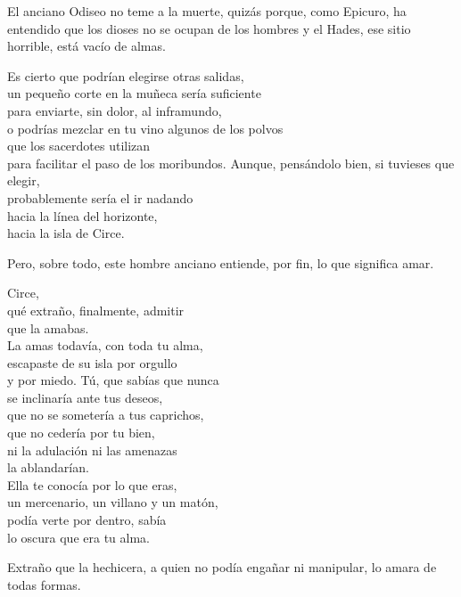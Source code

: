 El anciano Odiseo no teme a la muerte, quizás porque, como Epicuro, ha entendido que los dioses no se ocupan de los hombres y el Hades, ese sitio horrible, está vacío de almas.

\begin{versopropio}
Es cierto que podrían elegirse otras salidas,\\
un pequeño corte en la muñeca sería suficiente\\
para enviarte, sin dolor, al inframundo,\\
o podrías mezclar en tu vino algunos de los polvos\\
que los sacerdotes utilizan\\
para facilitar el paso de los moribundos.
\stanzabreak
Aunque, pensándolo bien, si tuvieses que elegir,\\
probablemente sería el ir nadando\\
hacia la línea del horizonte,\\
hacia la isla de Circe.
\end{versopropio}

Pero, sobre todo, este hombre anciano entiende, por fin, lo que significa amar.

\begin{versopropio}
Circe,\\
qué extraño, finalmente, admitir\\
que la amabas.\\
La amas todavía, con toda tu alma,\\
escapaste de su isla por orgullo\\
y por miedo.
\stanzabreak
Tú, que sabías que nunca\\
se inclinaría ante tus deseos,\\
que no se sometería a tus caprichos,\\
que no cedería por tu bien,\\
ni la adulación ni las amenazas\\
la ablandarían.\\
Ella te conocía por lo que eras,\\
un mercenario, un villano y un matón,\\
podía verte por dentro, sabía\\
lo oscura que era tu alma.
\end{versopropio}

Extraño que la hechicera, a quien no podía engañar ni manipular, lo amara de todas formas.


